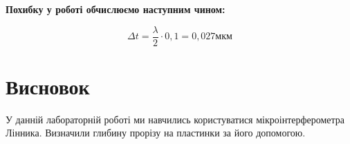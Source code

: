 
\begin{center}
  \textbf{Похибку у роботі обчислюємо наступним чином:}
\end{center}
$$\Delta t = \frac{\lambda}{2} \cdot 0,1 = 0,027 мкм$$
\section{Висновок}
\setlength{\parindent}{4em}
\qquad У данній лабораторній роботі ми навчились користуватися мікроінтерферометра Лінника. Визначили глибину прорізу на пластинки за його допомогою.

